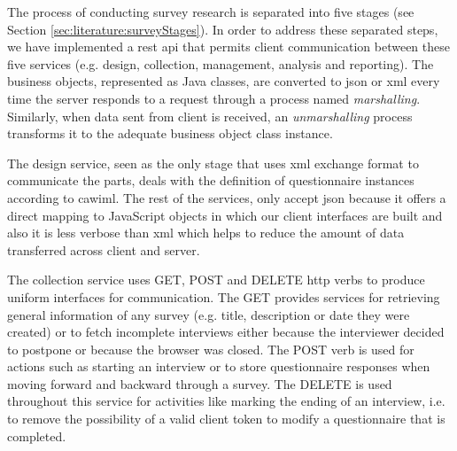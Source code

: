 	The process of conducting survey research is separated into five stages (see Section \ref{sec:literature:surveyStages}). In order to address these separated steps, we have implemented a \gls{rest} \gls{api} that permits client communication between these five services (e.g. design, collection, management, analysis and reporting). The business objects, represented as Java classes, are converted to \gls{json} or \gls{xml} every time the server responds to a request through a process named \emph{marshalling}. Similarly, when data sent from client is received, an \emph{unmarshalling} process transforms it to the adequate business object class instance.

	The design service, seen as the only stage that uses \gls{xml} exchange format to communicate the parts, deals with the definition of questionnaire instances according to \gls{cawiml}. The rest of the services, only accept \gls{json} because it offers a direct mapping to JavaScript objects in which our client interfaces are built and also it is less verbose than \gls{xml} which helps to reduce the amount of data transferred across client and server.

	The collection service uses GET, POST and DELETE \gls{http} verbs to produce uniform interfaces for communication. The GET provides services for retrieving general information of any survey (e.g. title, description or date they were created) or to fetch incomplete interviews either because the interviewer decided to postpone or because the browser was closed. The POST verb is used for actions such as starting an interview or to store questionnaire responses when moving forward and backward through a survey. The DELETE is used throughout this service for activities like marking the ending of an interview, i.e. to remove the possibility of a valid client token to modify a questionnaire that is completed.


	